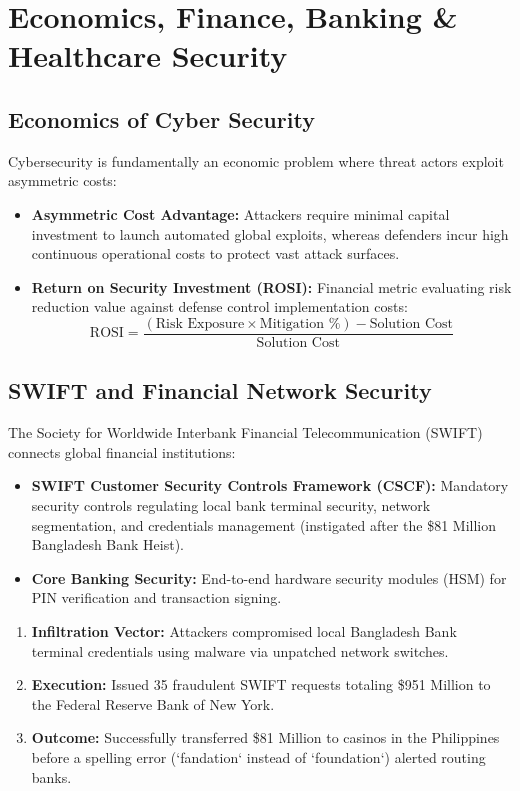 \documentclass[12pt,a4paper]{article}
\begin{document}
\section{Economics, Finance, Banking \& Healthcare Security}

\subsection{Economics of Cyber Security}
Cybersecurity is fundamentally an economic problem where threat actors exploit asymmetric costs:
\begin{itemize}[leftmargin=*, itemsep=3pt]
  \item \textbf{Asymmetric Cost Advantage:} Attackers require minimal capital investment to launch automated global exploits, whereas defenders incur high continuous operational costs to protect vast attack surfaces.
  \item \textbf{Return on Security Investment (ROSI):} Financial metric evaluating risk reduction value against defense control implementation costs:
  \[
  \text{ROSI} = \frac{(\text{Risk Exposure} \times \text{Mitigation \%}) - \text{Solution Cost}}{\text{Solution Cost}}
  \]
\end{itemize}

\subsection{SWIFT and Financial Network Security}
The Society for Worldwide Interbank Financial Telecommunication (SWIFT) connects global financial institutions:
\begin{itemize}[leftmargin=*, itemsep=3pt]
  \item \textbf{SWIFT Customer Security Controls Framework (CSCF):} Mandatory security controls regulating local bank terminal security, network segmentation, and credentials management (instigated after the \$81 Million Bangladesh Bank Heist).
  \item \textbf{Core Banking Security:} End-to-end hardware security modules (HSM) for PIN verification and transaction signing.
\end{itemize}

\begin{tcolorbox}[examplebox, title={\textbf{Real-World Case Study: Bangladesh Bank SWIFT Heist (2016)}}]
\begin{enumerate}[leftmargin=*, itemsep=3pt]
  \item \textbf{Infiltration Vector:} Attackers compromised local Bangladesh Bank terminal credentials using malware via unpatched network switches.
  \item \textbf{Execution:} Issued 35 fraudulent SWIFT requests totaling \$951 Million to the Federal Reserve Bank of New York.
  \item \textbf{Outcome:} Successfully transferred \$81 Million to casinos in the Philippines before a spelling error (`fandation` instead of `foundation`) alerted routing banks.
\end{enumerate}
\end{tcolorbox}
\end{document}
